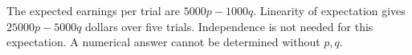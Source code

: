 The expected earnings per trial are $5000p-1000q$. Linearity of expectation gives $\boxed{25000p-5000q}$ dollars over five trials. Independence is not needed for this expectation. A numerical answer cannot be determined without $p,q$.
